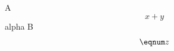 \documentclass{article}
\begin{document}
A \begin{equation*}x+y\end{equation*}alpha B
\[
\eqnum z
\]
\end{document}
